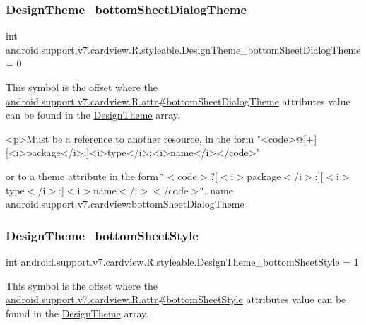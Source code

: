 \subsubsection{\texorpdfstring{Design\+Theme\+\_\+bottom\+Sheet\+Dialog\+Theme}{DesignTheme\_bottomSheetDialogTheme}}
{\footnotesize\ttfamily int android.\+support.\+v7.\+cardview.\+R.\+styleable.\+Design\+Theme\+\_\+bottom\+Sheet\+Dialog\+Theme = 0\hspace{0.3cm}{\ttfamily [static]}}

This symbol is the offset where the \hyperlink{classandroid_1_1support_1_1v7_1_1cardview_1_1R_1_1attr_a017f8091d4f249f077388e3d68476f2d}{android.\+support.\+v7.\+cardview.\+R.\+attr\#bottom\+Sheet\+Dialog\+Theme} attribute\textquotesingle{}s value can be found in the \hyperlink{classandroid_1_1support_1_1v7_1_1cardview_1_1R_1_1styleable_af2ab89f285aaee8ac3e0729dec94e16d}{Design\+Theme} array.

\begin{DoxyVerb}      <p>Must be a reference to another resource, in the form "<code>@[+][<i>package</i>:]<i>type</i>:<i>name</i></code>"
\end{DoxyVerb}
 or to a theme attribute in the form \char`\"{}$<$code$>$?\mbox{[}$<$i$>$package$<$/i$>$\+:\mbox{]}\mbox{[}$<$i$>$type$<$/i$>$\+:\mbox{]}$<$i$>$name$<$/i$>$$<$/code$>$\char`\"{}.  name android.\+support.\+v7.\+cardview\+:bottom\+Sheet\+Dialog\+Theme \mbox{\label{classandroid_1_1support_1_1v7_1_1cardview_1_1R_1_1styleable_a836f93ed42ba933abdd786be29d4126e}} 
\subsubsection{\texorpdfstring{Design\+Theme\+\_\+bottom\+Sheet\+Style}{DesignTheme\_bottomSheetStyle}}
{\footnotesize\ttfamily int android.\+support.\+v7.\+cardview.\+R.\+styleable.\+Design\+Theme\+\_\+bottom\+Sheet\+Style = 1\hspace{0.3cm}{\ttfamily [static]}}

This symbol is the offset where the \hyperlink{classandroid_1_1support_1_1v7_1_1cardview_1_1R_1_1attr_a67ed112d398d6e373347557827c40fdd}{android.\+support.\+v7.\+cardview.\+R.\+attr\#bottom\+Sheet\+Style} attribute\textquotesingle{}s value can be found in the \hyperlink{classandroid_1_1support_1_1v7_1_1cardview_1_1R_1_1styleable_af2ab89f285aaee8ac3e0729dec94e16d}{Design\+Theme} array.

